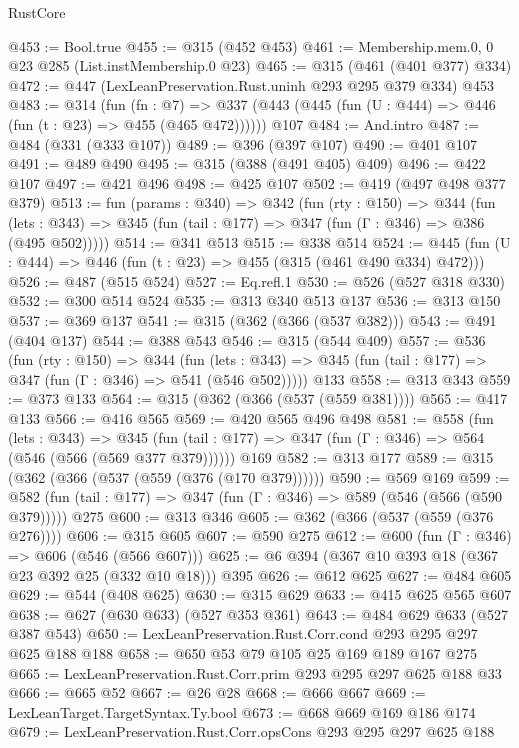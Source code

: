 \begin{lexlean}{RustCore}
\begin{coremodule}
@453 := Bool.true
@455 := @315 (@452 @453)
@461 := Membership.mem.{0, 0} @23 @285 (List.instMembership.{0} @23)
@465 := @315 (@461 (@401 @377) @334)
@472 := @447 (LexLeanPreservation.Rust.uninh @293 @295 @379 @334) @453
@483 := @314
    (fun (fn : @7) =>
    @337 (@443 (@445 (fun (U : @444) => @446 (fun (t : @23) => @455 (@465 @472))))))
    @107
@484 := And.intro
@487 := @484 (@331 (@333 @107))
@489 := @396 (@397 @107)
@490 := @401 @107
@491 := @489 @490
@495 := @315 (@388 (@491 @405) @409)
@496 := @422 @107
@497 := @421 @496
@498 := @425 @107
@502 := @419 (@497 @498 @377 @379)
@513 := fun (params : @340) =>
  @342
    (fun (rty : @150) =>
    @344
      (fun (lets : @343) => @345 (fun (tail : @177) => @347 (fun (Γ : @346) => @386 (@495 @502)))))
@514 := @341 @513
@515 := @338 @514
@524 := @445 (fun (U : @444) => @446 (fun (t : @23) => @455 (@315 (@461 @490 @334) @472)))
@526 := @487 (@515 @524)
@527 := Eq.refl.{1}
@530 := @526 (@527 @318 @330)
@532 := @300 @514 @524
@535 := @313 @340 @513 @137
@536 := @313 @150
@537 := @369 @137
@541 := @315 (@362 (@366 (@537 @382)))
@543 := @491 (@404 @137)
@544 := @388 @543
@546 := @315 (@544 @409)
@557 := @536
    (fun (rty : @150) =>
    @344
      (fun (lets : @343) => @345 (fun (tail : @177) => @347 (fun (Γ : @346) => @541 (@546 @502)))))
    @133
@558 := @313 @343
@559 := @373 @133
@564 := @315 (@362 (@366 (@537 (@559 @381))))
@565 := @417 @133
@566 := @416 @565
@569 := @420 @565 @496 @498
@581 := @558
    (fun (lets : @343) =>
    @345 (fun (tail : @177) => @347 (fun (Γ : @346) => @564 (@546 (@566 (@569 @377 @379))))))
    @169
@582 := @313 @177
@589 := @315 (@362 (@366 (@537 (@559 (@376 (@170 @379))))))
@590 := @569 @169
@599 := @582 (fun (tail : @177) => @347 (fun (Γ : @346) => @589 (@546 (@566 (@590 @379))))) @275
@600 := @313 @346
@605 := @362 (@366 (@537 (@559 (@376 @276))))
@606 := @315 @605
@607 := @590 @275
@612 := @600 (fun (Γ : @346) => @606 (@546 (@566 @607)))
@625 := @6 @394 (@367 @10 @393 @18 (@367 @23 @392 @25 (@332 @10 @18))) @395
@626 := @612 @625
@627 := @484 @605
@629 := @544 (@408 @625)
@630 := @315 @629
@633 := @415 @625 @565 @607
@638 := @627 (@630 @633) (@527 @353 @361)
@643 := @484 @629 @633 (@527 @387 @543)
@650 := LexLeanPreservation.Rust.Corr.cond @293 @295 @297 @625 @188 @188
@658 := @650 @53 @79 @105 @25 @169 @189 @167 @275
@665 := LexLeanPreservation.Rust.Corr.prim @293 @295 @297 @625 @188 @33
@666 := @665 @52
@667 := @26 @28
@668 := @666 @667
@669 := LexLeanTarget.TargetSyntax.Ty.bool
@673 := @668 @669 @169 @186 @174
@679 := LexLeanPreservation.Rust.Corr.opsCons @293 @295 @297 @625 @188

\end{coremodule}
\end{lexlean}
